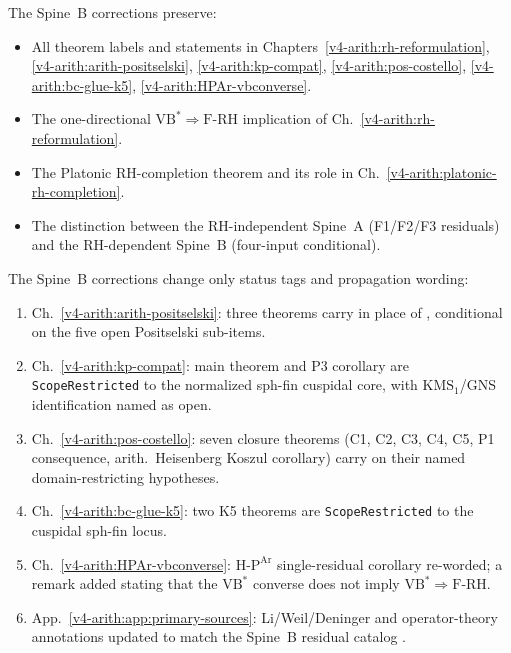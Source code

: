 \begin{remark}
\label{v4-arith:w3-audit-B:rem:preserved}
The Spine~B corrections preserve:
\begin{itemize}
\item All theorem labels and statements in
Chapters~\ref{v4-arith:rh-reformulation},
\ref{v4-arith:arith-positselski}, \ref{v4-arith:kp-compat},
\ref{v4-arith:pos-costello}, \ref{v4-arith:bc-glue-k5},
\ref{v4-arith:HPAr-vbconverse}.
\item The one-directional
\(\mathrm{VB}^{*}\Rightarrow\mathrm{F}\text{-}\mathrm{RH}\)
implication of Ch.~\ref{v4-arith:rh-reformulation}.
\item The Platonic RH-completion theorem
 and its role in
Ch.~\ref{v4-arith:platonic-rh-completion}.
\item The distinction between the RH-independent Spine~A (F1/F2/F3
residuals) and the RH-dependent Spine~B (four-input conditional).
\end{itemize}
\end{remark}

\begin{remark}
\label{v4-arith:w3-audit-B:rem:changed}
The Spine~B corrections change only status tags and propagation
wording:
\begin{enumerate}
\item Ch.~\ref{v4-arith:arith-positselski}: three theorems carry
\ClaimStatusProvedHereConditional{} in place of \ClaimStatusProvedHere{},
conditional on the five open Positselski sub-items.
\item Ch.~\ref{v4-arith:kp-compat}: main theorem and P3 corollary
are \texttt{ScopeRestricted} to the normalized sph-fin cuspidal core,
with \(\mathrm{KMS}_{1}\)/GNS identification named as open.
\item Ch.~\ref{v4-arith:pos-costello}: seven closure theorems (C1,
C2, C3, C4, C5, P1 consequence, arith.~Heisenberg Koszul corollary)
carry \ClaimStatusProvedHereConditional{} on their named
domain-restricting hypotheses.
\item Ch.~\ref{v4-arith:bc-glue-k5}: two K5 theorems are
\texttt{ScopeRestricted} to the cuspidal sph-fin locus.
\item Ch.~\ref{v4-arith:HPAr-vbconverse}:
\(\mathrm{H}\text{-}\mathrm{P}^{\mathrm{Ar}}\) single-residual
corollary re-worded; a remark added stating that the
\(\mathrm{VB}^{*}\) converse does not imply
\(\mathrm{VB}^{*}\Rightarrow\mathrm{F}\text{-}\mathrm{RH}\).
\item App.~\ref{v4-arith:app:primary-sources}: Li/Weil/Deninger
and operator-theory annotations updated to match the Spine~B
residual catalog .
\end{enumerate}
\end{remark}


